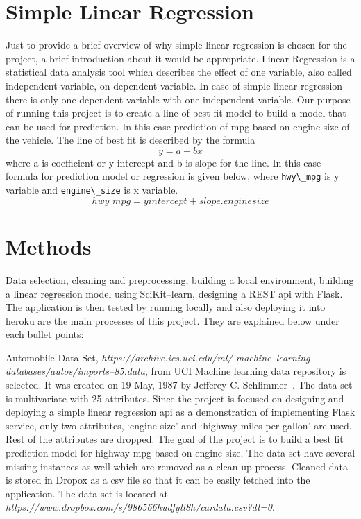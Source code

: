 \section{Simple Linear Regression}
  Just to provide a brief overview of why simple linear regression is
  chosen for the project, a brief introduction about it would be
  appropriate. Linear Regression is a statistical data analysis tool
  which describes the effect of one variable, also called independent
  variable, on dependent variable. In case of simple linear regression
  there is only one dependent variable with one independent variable.
  Our purpose of running this project
  is to create a line of best fit model to build a model that can be used
  for prediction. In this case prediction of mpg based on engine size
  of the vehicle. The line of best fit is described by the
  formula \[y = a + bx\] where a is coefficient or y intercept and b is
  slope for the line. In this case formula for prediction model or
  regression is given below, where \verb|hwy\_mpg| is y variable and
  \verb|engine\_size| is x variable.
  \[hwy\_mpg = yintercept + slope.enginesize\] 
\section{Methods}
  Data selection, cleaning and preprocessing, building a local
  environment, building a linear regression model using SciKit--learn,
  designing a REST api with Flask. The application is then tested by running 
  locally and also deploying it into heroku are the main
  processes of this project. They are explained below under each bullet
  points:

   Automobile Data Set, \textit{https://archive.ics.uci.edu/ml/
   machine--learning-databases/autos/imports--85.data}, from UCI
   Machine learning data repository is selected. It was created
   on 19 May, 1987 by Jefferey C. Schlimmer~\cite{hid-sp18-415-uci-com}. The
   data set is multivariate with 25 attributes. Since the project
   is focused on designing and deploying a simple linear
   regression api as a demonstration of implementing Flask service,
   only two attributes, `engine size' and `highway miles per gallon'
   are used. Rest of the attributes are dropped. The goal of the
   project is to build a best fit prediction model for highway mpg
   based on engine size. The data set have several missing instances
   as well which are removed as a clean up process. Cleaned data is stored in
   Dropox as a csv   file so that it can be easily fetched into the
   application. The data set is located at 
 \textit{https://www.dropbox.com/s/986566hudfytl8h/cardata.csv?dl=0}.
  
